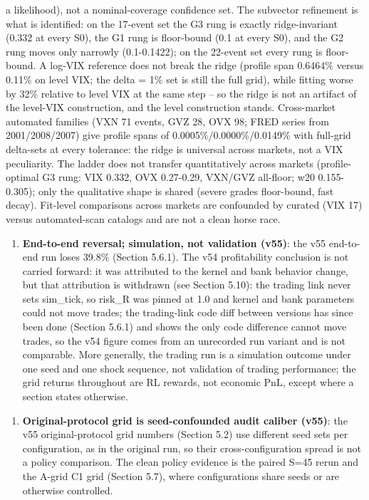 \documentclass[11pt]{article}
\begin{document}
\begin{enumerate}
a likelihood), not a nominal-coverage confidence set. The subvector refinement is what is identified: on the 17-event set the G3 rung is exactly ridge-invariant (0.332 at every S0), the G1 rung is floor-bound (0.1 at every S0), and the G2 rung moves only narrowly (0.1-0.1422); on the 22-event set every rung is floor-bound. A log-VIX reference does not break the ridge (profile span 0.6464\% versus 0.11\% on level VIX; the delta = 1\% set is still the full grid), while fitting worse by 32\% relative to level VIX at the same step -- so the ridge is not an artifact of the level-VIX construction, and the level construction stands. Cross-market automated families (VXN 71 events, GVZ 28, OVX 98; FRED series from 2001/2008/2007) give profile spans of 0.0005\%/0.0000\%/0.0149\% with full-grid delta-sets at every tolerance: the ridge is universal across markets, not a VIX peculiarity. The ladder does not transfer quantitatively across markets (profile-optimal G3 rung: VIX 0.332, OVX 0.27-0.29, VXN/GVZ all-floor; w20 0.155-0.305); only the qualitative shape is shared (severe grades floor-bound, fast decay). Fit-level comparisons across markets are confounded by curated (VIX 17) versus automated-scan catalogs and are not a clean horse race.
\end{enumerate}

\begin{enumerate}
\item \textbf{End-to-end reversal; simulation, not validation (v55)}: the v55 end-to-end run loses 39.8\% (Section 5.6.1). The v54 profitability conclusion is not carried forward: it was attributed to the kernel and bank behavior change, but that attribution is withdrawn (see Section 5.10): the trading link never sets sim\_tick, so risk\_R was pinned at 1.0 and kernel and bank parameters could not move trades; the trading-link code diff between versions has since been done (Section 5.6.1) and shows the only code difference cannot move trades, so the v54 figure comes from an unrecorded run variant and is not comparable. More generally, the trading run is a simulation outcome under one seed and one shock sequence, not validation of trading performance; the grid returns throughout are RL rewards, not economic PnL, except where a section states otherwise.
\end{enumerate}

\begin{enumerate}
\item \textbf{Original-protocol grid is seed-confounded audit caliber (v55)}: the v55 original-protocol grid numbers (Section 5.2) use different seed sets per configuration, as in the original run, so their cross-configuration spread is not a policy comparison. The clean policy evidence is the paired S=45 rerun and the A-grid C1 grid (Section 5.7), where configurations share seeds or are otherwise controlled.
\end{enumerate}
\end{document}

